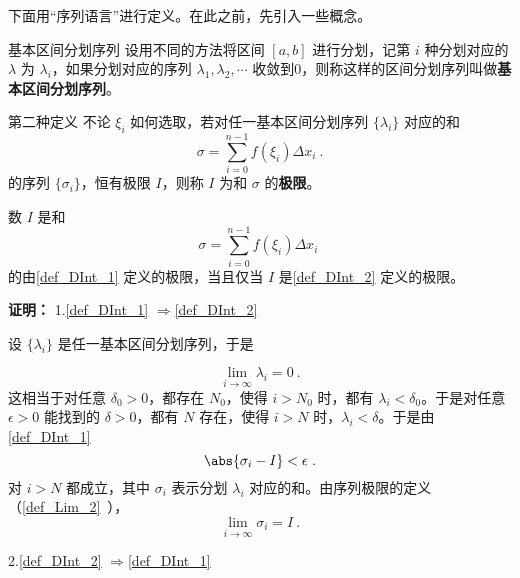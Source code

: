 下面用“序列语言”进行定义。在此之前，先引入一些概念。
\begin{definition}{基本区间分划序列}\label{def_DInt_2}
设用不同的方法将区间 $[a,b]$ 进行分划，记第 $i$ 种分划对应的 $\lambda$ 为 $\lambda_i$，如果分划对应的序列 $\lambda_1,\lambda_2,\cdots$ 收敛到0，则称这样的区间分划序列叫做\textbf{基本区间分划序列}。
\end{definition}

\begin{definition}{第二种定义}
不论 $\xi_i$ 如何选取，若对任一基本区间分划序列 $\{\lambda_i\}$ 对应的和 
\begin{equation}
\sigma=\sum_{i=0}^{n-1}f(\xi_i)\Delta x_i~.
\end{equation}
的序列 $\{\sigma_i\}$，恒有极限 $I$，则称 $I$ 为和 $\sigma$ 的\textbf{极限}。
\end{definition}
\begin{theorem}{}
数 $I$ 是和 
\begin{equation}
\sigma=\sum_{i=0}^{n-1}f(\xi_i)\Delta x_i~
\end{equation}
的由\autoref{def_DInt_1} 定义的极限，当且仅当 $I$ 是\autoref{def_DInt_2} 定义的极限。
\end{theorem}
\textbf{证明：}
1.\autoref{def_DInt_1} $\Rightarrow$\autoref{def_DInt_2} 

设 $\{\lambda_i\}$ 是任一基本区间分划序列，于是 

\begin{equation}
\lim\limits_{i\rightarrow\infty}\lambda_i=0~.
\end{equation}
这相当于对任意 $\delta_0>0$，都存在 $N_0$，使得 $i>N_0$ 时，都有 $\lambda_i<\delta_0$。于是对任意 $\epsilon>0$ 能找到的 $\delta>0$，都有 $N$ 存在，使得 $i>N$ 时，$\lambda_i<\delta$。于是由\autoref{def_DInt_1} 
\begin{equation}
\abs{\sigma_i-I}<\epsilon~.
\end{equation}
对 $i>N$ 都成立，其中 $\sigma_i$ 表示分划 $\lambda_i$ 对应的和。由序列极限的定义（\autoref{def_Lim_2}~），
\begin{equation}
\lim_{i\rightarrow\infty} \sigma_i=I~.
\end{equation}

2.\autoref{def_DInt_2} $\Rightarrow$\autoref{def_DInt_1} 

